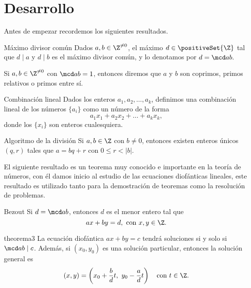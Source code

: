 \section{Desarrollo}
Antes de empezar recordemos los siguientes resultados.

\begin{definition.box}{Máximo divisor común}{}
    Dados $a,b \in \Z^{\neq 0}$, el máximo $d \in \positiveSet{\Z}$ tal que $d \mid a$ y $d \mid b$ es el máximo divisor común,
    y lo denotamos por $d = \mcd a b.$
\end{definition.box}

\begin{definition.box}{}{}
    Si $a,b \in \Z^{\neq 0}$ con $\mcd a b = 1$, entonces diremos que $a$ y $b$ son coprimos, primos relativos o primos entre sí.
\end{definition.box}

\begin{definition.box}{Combinación lineal}{}
    Dados los enteros $a_1, a_2, \ldots, a_k$, definimos una combinación lineal de los números $\{a_i\}$ como un número de la forma
    \[
        a_1 x_1 + a_2 x_2 + \ldots + a_k x_k,
    \]
    donde los $\{x_i\}$ son enteros cualesquiera.
\end{definition.box}

\begin{theorem.box}{Algoritmo de la división}{}
    Si $a, b \in \Z$ con $b \neq 0$, entonces existen enteros únicos $(q,r)$ tales que $a = bq + r$ con $0 \leq r < |b|$.
\end{theorem.box}

El siguiente resultado es un teorema muy conocido e importante en la teoría de números, con él damos inicio al
estudio de las ecuaciones diofánticas lineales, este resultado es utilizado tanto para la demostración de teoremas como
la resolución de problemas.

\begin{theorem.box}{Bezout}{}
    Si $d = \mcd a b$, entonces $d$ es el menor entero tal que
    \[
        ax + by = d,\ \text{con}\ x,y \in \Z.
    \]
\end{theorem.box}

\begin{theorem.box}{}{theorema3}
    La ecuación diofántica $ax + by = c$ tendrá soluciones si y solo si $\mcd a b \mid c$.
    Además, si $(x_0,y_0)$ es una solución particular, entonces la solución general es
        \[
            (x,y) = \left(x_0+\frac{b}{d}t,\ y_0 -\frac{a}{d}t\right) \quad \text{con}\ t \in \Z.
        \]
\end{theorem.box}


